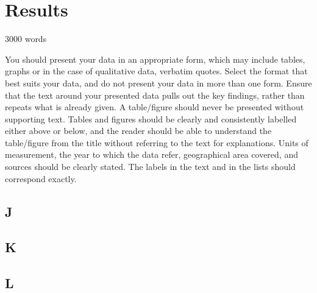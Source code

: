 \chapter{Results}\label{ch:results}

3000 words

You should present your data in an appropriate form, which may include tables, graphs or in the case of qualitative data, verbatim quotes. Select the format that best suits your data, and do not present your data in more than one form. Ensure that the text around your presented data pulls out the key findings, rather than repeats what is already given. A table/figure should never be presented without supporting text. Tables and figures should be clearly and consistently labelled either above or below, and the reader should be able to understand the table/figure from the title without referring to the text for explanations. Units of measurement, the year to which the data refer, geographical area covered, and sources should be clearly stated. The labels in the text and in the lists should correspond exactly.

\section{J}\label{sec:J}


\section{K}\label{sec:K}


\section{L}\label{sec:L}
